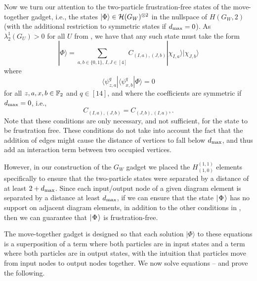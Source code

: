 \documentclass[../thesis-main/thesis-main]{subfiles}
\begin{document}
Now we turn our attention to the two-particle frustration-free states of the move-together gadget, i.e., the states $|\Phi\rangle\in\mathcal{H}(G_{W})^{\otimes 2}$ in the nullspace of $H(G_W,2)$ (with the additional restriction to symmetric states if $d_{\text{max}} = 0$). As $\lambda_2^1(G_{U}) >0$ for all $U$ from , we have that any such state must take the form
\begin{equation}
|\Phi\rangle=\sum_{a,b \in \{0,1\},\,I,J \in [4]}C_{(I,a),(J,b)}|\chi_{I,a}\rangle|\chi_{J,b}\rangle\label{eq:chi_superposition}
\end{equation}
where 
\begin{equation}
\langle\psi_{z,a}^{q}|\langle\psi_{x,b}^{q}|\Phi\rangle=0\label{eq:frustration_free}
\end{equation}
for all $z,a,x,b\in\mathbb{F}_2$ and $q\in[14]$, and where the coefficients are symmetric if $d_{\text{max}} = 0$, i.e.,
\begin{equation}
C_{(I,a),(J,b)}=C_{(J,b),(I,a)},\label{eq:symmetric_coefs}.
\end{equation}  
Note that these conditions are only necessary, and not sufficient, for the state to be frustration free.  These conditions do not take into account the fact that the addition of edges might cause the distance of vertices to fall below $d_{\text{max}}$, and thus add an interaction term between two occupied vertices.

However, in our construction of the $G_W$ gadget we placed the $H_{(1,0)}^{(1,1)}$ elements specifically to ensure that the two-particle states were separated by a distance of at least $2+ d_{\text{max}}$.  Since each input/output node of a given diagram element is separated by a distance at least $d_{\text{max}}$, if we can ensure that the state $|\mspace{2mu} \Phi \mspace{2mu} \rangle$ has no support on adjacent diagram elements, in addition to the other conditions in , then we can guarantee that $|\mspace{2mu} \Phi \mspace{2mu} \rangle$ is frustration-free.

The move-together gadget is designed so that each solution $|\Phi\rangle$ to these equations  is a superposition of a term where both particles are in input states and a term where both particles are in output states, with the intuition that particles move from input nodes to output nodes together. We now solve equations -- and prove the following.
\end{document}
